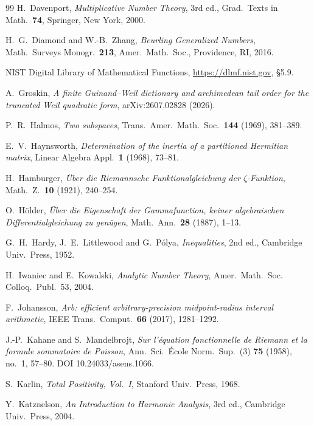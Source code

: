 \documentclass[11pt]{amsart}
\theoremstyle{definition}
\theoremstyle{remark}
\begin{document}
\begin{thebibliography}{99}
 H.~Davenport, \emph{Multiplicative Number Theory}, 3rd ed., Grad.\ Texts in Math.\ \textbf{74}, Springer, New York, 2000.

 H.~G.~Diamond and W.-B.~Zhang, \emph{Beurling Generalized Numbers}, Math.\ Surveys Monogr.\ \textbf{213}, Amer.~Math.~Soc., Providence, RI, 2016.

 NIST Digital Library of Mathematical Functions, \url{https://dlmf.nist.gov}, \S5.9.

 A.~Groskin, \emph{A finite Guinand--Weil dictionary and archimedean tail
order for the truncated Weil quadratic form}, arXiv:2607.02828 (2026).

 P.~R.~Halmos, \emph{Two subspaces}, Trans.\ Amer.\ Math.\ Soc.\ \textbf{144} (1969), 381--389.

 E.~V.~Haynsworth, \emph{Determination of the inertia of a partitioned Hermitian
matrix}, Linear Algebra Appl.\ \textbf{1} (1968), 73--81.

 H.~Hamburger, \emph{\"Uber die Riemannsche Funktionalgleichung der $\zeta$-Funktion}, Math.\ Z.\ \textbf{10} (1921), 240--254.

 O.~H\"older, \emph{\"Uber die Eigenschaft der Gammafunction, keiner algebraischen Differentialgleichung zu gen\"ugen}, Math.\ Ann.\ \textbf{28} (1887), 1--13.

 G.~H.~Hardy, J.~E.~Littlewood and G.~P\'olya, \emph{Inequalities}, 2nd ed., Cambridge Univ.~Press, 1952.

 H.~Iwaniec and E.~Kowalski, \emph{Analytic Number Theory}, Amer.~Math.~Soc.
Colloq.~Publ.~53, 2004.

 F.~Johansson, \emph{Arb: efficient arbitrary-precision midpoint-radius interval
arithmetic}, IEEE Trans.\ Comput.\ \textbf{66} (2017), 1281--1292.

 J.-P.~Kahane and S.~Mandelbrojt, \emph{Sur l'\'equation fonctionnelle de Riemann et la formule sommatoire de Poisson}, Ann.\ Sci.\ \'Ecole Norm.\ Sup.\ (3) \textbf{75} (1958), no.~1, 57--80. DOI 10.24033/asens.1066.

 S.~Karlin, \emph{Total Positivity, Vol.~I}, Stanford Univ.~Press, 1968.

 Y.~Katznelson, \emph{An Introduction to Harmonic Analysis}, 3rd ed.,
Cambridge Univ.~Press, 2004.


\end{thebibliography}
\end{document}
